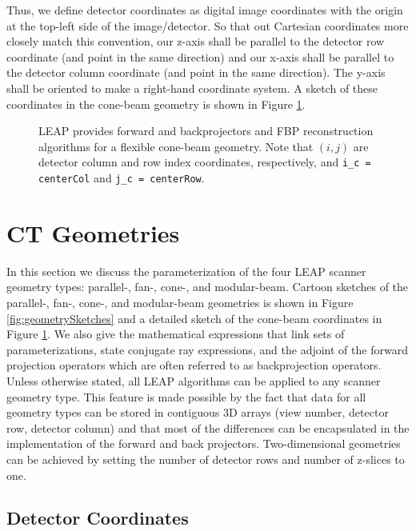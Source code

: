 \documentclass[11pt]{article}
\begin{document}
Thus, we define detector coordinates as digital image coordinates with the origin at the top-left side of the image/detector.  So that out Cartesian coordinates more closely match this convention, our z-axis shall be parallel to the detector row coordinate (and point in the same direction) and our x-axis shall be parallel to the detector column coordinate (and point in the same direction).  The y-axis shall be oriented to make a right-hand coordinate system.  A sketch of these coordinates in the cone-beam geometry is shown in Figure \ref{fig:coneBeamSketch}.

\begin{figure}[h]

\caption{LEAP provides forward and backprojectors and FBP reconstruction algorithms for a flexible cone-beam geometry.  Note that $(i,j)$ are detector column and row index coordinates, respectively, and \texttt{i\_c = centerCol} and \texttt{j\_c = centerRow}.} \label{fig:coneBeamSketch}
\end{figure}

\section{CT Geometries} \label{sec:CTGeometries}

In this section we discuss the parameterization of the four LEAP scanner geometry types: parallel-, fan-, cone-, and modular-beam.  Cartoon sketches of the parallel-, fan-, cone-, and modular-beam geometries is shown in Figure \ref{fig:geometrySketches} and a detailed sketch of the cone-beam coordinates in Figure \ref{fig:coneBeamSketch}.  We also give the mathematical expressions that link sets of parameterizations, state conjugate ray expressions, and the adjoint of the forward projection operators which are often referred to as backprojection operators.  Unless otherwise stated, all LEAP algorithms can be applied to any scanner geometry type.  This feature is made possible by the fact that data for all geometry types can be stored in contiguous 3D arrays (view number, detector row, detector column) and that most of the differences can be encapsulated in the implementation of the forward and back projectors.  Two-dimensional geometries can be achieved by setting the number of detector rows and number of z-slices to one.

\subsection{Detector Coordinates} \label{sec:DetectorCoordinates}
\end{document}
